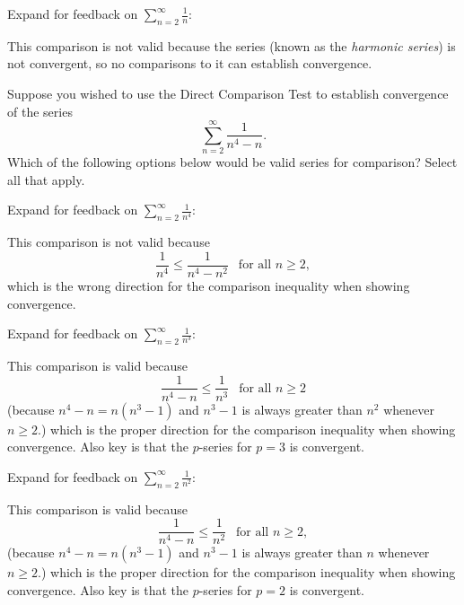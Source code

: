 \documentclass{ximera}
\begin{document}
\begin{exercise}
\begin{feedback}
Expand for feedback on {$\displaystyle \sum_{n=2}^\infty \frac{1}{n}$}:
\begin{expandable}
This comparison is not valid because the series (known as the \textit{harmonic series}) is not convergent, so no comparisons to it can establish convergence.
\end{expandable}
\end{feedback}
\end{exercise}


\begin{exercise}
Suppose you wished to use the Direct Comparison Test to establish convergence of the series
\[ \sum_{n=2}^\infty \frac{1}{n^4 - n}. \]
Which of the following options below would be valid series for comparison? Select all that apply.
\begin{selectAll}
\end{selectAll}
\begin{feedback}
Expand for feedback on {$\displaystyle \sum_{n=2}^\infty \frac{1}{n^4}$}:
\begin{expandable}
This comparison is not valid because
\[ \frac{1}{n^4} \leq \frac{1}{n^4-n^2}  \ \ \text{ for all } n \geq 2,\]
which is the wrong direction for the comparison inequality when showing convergence.
\end{expandable}

Expand for feedback on {$\displaystyle \sum_{n=2}^\infty \frac{1}{n^3}$}:
\begin{expandable}
This comparison is valid because
\[ \frac{1}{n^4-n} \leq \frac{1}{n^3}  \ \ \text{ for all } n \geq 2 \]
(because $n^4 - n = n(n^3-1)$ and $n^3 - 1$ is always greater than $n^2$ whenever $n \geq 2$.)
which is the proper direction for the comparison inequality when showing convergence. Also key is that the $p$-series for $p=3$ is convergent.
\end{expandable}

Expand for feedback on {$\displaystyle \sum_{n=2}^\infty \frac{1}{n^2}$}:
\begin{expandable}
This comparison is valid because
\[ \frac{1}{n^4-n} \leq \frac{1}{n^2}  \ \ \text{ for all } n \geq 2, \]
(because $n^4 - n = n(n^3-1)$ and $n^3 - 1$ is always greater than $n$ whenever $n \geq 2$.)
which is the proper direction for the comparison inequality when showing convergence. Also key is that the $p$-series for $p=2$ is convergent.
\end{expandable}

\end{feedback}
\end{exercise}
\end{document}
